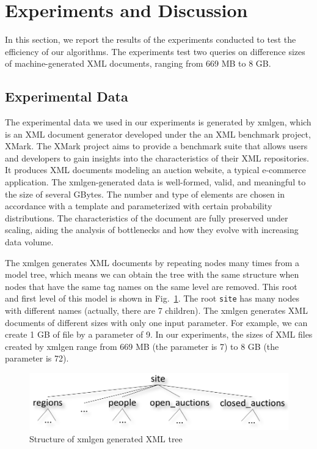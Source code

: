 \section{Experiments and Discussion}

In this section, we report the results of the experiments conducted to test the
efficiency of our algorithms. The experiments test two
queries on difference sizes of machine-generated XML documents, 
ranging from 669 MB to 8 GB.



\subsection{Experimental Data}

The experimental data we used in our experiments is generated by xmlgen, which is an 
XML document generator developed under the an XML benchmark project,  XMark\cite{XMark}. The XMark project aims to provide a benchmark suite that allows users and developers 
to gain insights into the characteristics of their XML repositories. 
It produces XML documents modeling an auction website, a typical e-commerce application. 
The xmlgen-generated data is well-formed, valid, and meaningful to the size of several 
GBytes. The number and type of elements are chosen in accordance with a template and parameterized
 with certain probability distributions. The characteristics of the document are fully preserved under scaling, 
 aiding the analysis of bottlenecks and how they evolve with increasing data volume.

The xmlgen generates XML documents by repeating nodes many times 
from a model tree, which means we can obtain the tree with 
the same structure when nodes that have the same tag names on the 
same level are removed. This root and first level of this model is 
shown in Fig.~\ref{fig:xmlgen1}. The root \texttt{site} has many nodes with different names 
(actually, there are 7 children). The xmlgen generates XML documents of different sizes with only one 
input parameter. For example, we can create 1 GB of file by a parameter of 9.  
In our experiments, the sizes of XML files created by xmlgen range from 
669 MB (the parameter is 7) to 8 GB (the parameter is 72).

\begin{figure} 
	\includegraphics[width=.99\linewidth]{partialtree/figures/xmlgen1.png}
	\caption{Structure of xmlgen generated XML tree}
	\label{fig:xmlgen1}
\end{figure}


